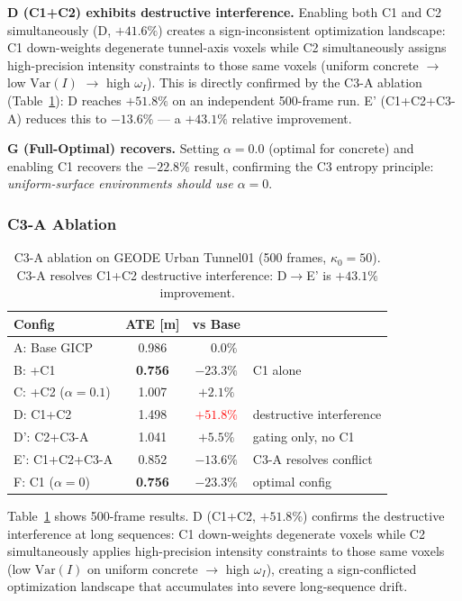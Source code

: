 \documentclass[letterpaper, 10pt, conference]{ieeeconf}
\newcommand{\best}[1]{\textbf{#1}}
\begin{document}
\textbf{D (C1+C2) exhibits destructive interference.}
Enabling both C1 and C2 simultaneously (D, $+41.6\%$) creates a sign-inconsistent
optimization landscape:
C1 down-weights degenerate tunnel-axis voxels while C2 simultaneously assigns
high-precision intensity constraints to those same voxels (uniform concrete
$\to$ low $\mathrm{Var}(I)$ $\to$ high $\omega_I$).
This is directly confirmed by the C3-A ablation (Table~\ref{tab:c3a}): D reaches
$+51.8\%$ on an independent 500-frame run.
E' (C1+C2+C3-A) reduces this to $-13.6\%$ — a $+43.1\%$ relative improvement.

\textbf{G (Full-Optimal) recovers.}
Setting $\alpha{=}0.0$ (optimal for concrete) and enabling C1 recovers the
$-22.8\%$ result, confirming the C3 entropy principle:
\textit{uniform-surface environments should use $\alpha{=}0$}.

\subsubsection{C3-A Ablation}\label{sec:c3a_ablation}

\begin{table}[t]
\centering
\caption{C3-A ablation on GEODE Urban Tunnel01 (500 frames, $\kappa_0{=}50$).
  C3-A resolves C1+C2 destructive interference: D$\to$E' is $\mathbf{+43.1\%}$ improvement.}
\label{tab:c3a}
\begin{tabular}{lccl}
\toprule
Config & ATE [m] & vs Base & \\
\midrule
A: Base GICP           & 0.986 & $\phantom{+}0.0\%$ & \\
B: +C1                 & \best{0.756} & \textcolor{win}{\textbf{$-23.3\%$}} & C1 alone \\
C: +C2 ($\alpha{=}0.1$) & 1.007 & $+2.1\%$  & \\
D: C1+C2               & 1.498 & \textcolor{red}{$+51.8\%$} & destructive interference \\
D': C2+C3-A            & 1.041 & $+5.5\%$  & gating only, no C1 \\
E': C1+C2+C3-A         & 0.852 & \textcolor{win}{$-13.6\%$} & C3-A resolves conflict \\
F: C1 ($\alpha{=}0$)   & \best{0.756} & \textcolor{win}{\textbf{$-23.3\%$}} & optimal config \\
\bottomrule
\end{tabular}
\end{table}

Table~\ref{tab:c3a} shows 500-frame results.
D (C1+C2, $+51.8\%$) confirms the destructive interference at long sequences:
C1 down-weights degenerate voxels while C2 simultaneously applies high-precision
intensity constraints to those same voxels (low $\mathrm{Var}(I)$ on uniform concrete
$\to$ high $\omega_I$), creating a sign-conflicted optimization landscape that
accumulates into severe long-sequence drift.
\end{document}
